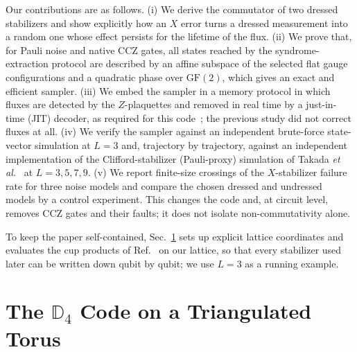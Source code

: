\documentclass[a4paper]{article}
\newcommand{\GF}{\mathrm{GF}(2)}
\begin{document}
Our contributions are as follows. (i) We derive the commutator of two dressed stabilizers and show explicitly how an $X$ error turns a dressed measurement into a random one whose effect persists for the lifetime of the flux. (ii) We prove that, for Pauli noise and native CCZ gates, all states reached by the syndrome-extraction protocol are described by an affine subspace of the selected flat gauge configurations and a quadratic phase over $\GF$, which gives an exact and efficient sampler. (iii) We embed the sampler in a memory protocol in which fluxes are detected by the $Z$-plaquettes and removed in real time by a just-in-time (JIT) decoder, as required for this code~\cite{kobayashi2025clifford,davydova2025knots}; the previous study did not correct fluxes at all. (iv) We verify the sampler against an independent brute-force state-vector simulation at $L=3$ and, trajectory by trajectory, against an independent implementation of the Clifford-stabilizer (Pauli-proxy) simulation of Takada \emph{et al.}~\cite{takada2026exact} at $L=3,5,7,9$. (v) We report finite-size crossings of the $X$-stabilizer failure rate for three noise models and compare the chosen dressed and undressed models by a control experiment. This changes the code and, at circuit level, removes CCZ gates and their faults; it does not isolate non-commutativity alone.

To keep the paper self-contained, Sec.~\ref{sec:d4} sets up explicit lattice coordinates and evaluates the cup products of Ref.~\cite{kobayashi2025clifford} on our lattice, so that every stabilizer used later can be written down qubit by qubit; we use $L=3$ as a running example.

\section{The \texorpdfstring{$\mathbb{D}_4$}{D4} Code on a Triangulated Torus}
\label{sec:d4}
\end{document}
